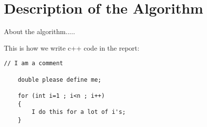 \section{Description of the Algorithm}
\label{sec:DescriptionOfTheAlgorithm}
About the algorithm.....

This is how we write c++ code in the report:

\begin{lstlisting}
// I am a comment

    double please define me;

    for (int i=1 ; i<n ; i++)
    {
        I do this for a lot of i's;
    }
\end{lstlisting}




